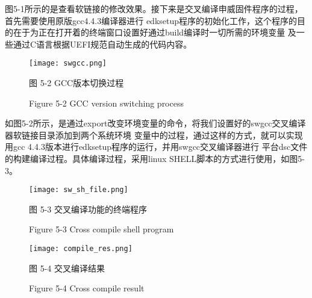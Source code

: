 图5-1所示的是查看软链接的修改效果。接下来是交叉编译申威固件程序的过程，首先需要使用原版gcc4.4.3编译器进行
edksetup程序的初始化工作，这个程序的目的在于为正在打开着的终端窗口设置好通过build编译时一切所需的环境变量
及一些通过C语言根据UEFI规范自动生成的代码内容。

\begin{figure}[htb]
    \vspace{0cm}   
    \setlength{\abovecaptionskip}{0.3cm}
	\centering
    \texttt{[image: swgcc.png]}
    \caption*{图 5-2 GCC版本切换过程}
    \setlength{\belowcaptionskip}{-0.7cm}
    \caption*{Figure 5-2 GCC version switching process}
\end{figure}

如图5-2所示，是通过export改变环境变量的命令，将我们设置好的swgcc交叉编译器软链接目录添加到两个系统环境
变量中的过程，通过这样的方式，就可以实现用gcc 4.4.3版本进行edksetup程序的运行，并用swgcc交叉编译器进行
平台dsc文件的构建编译过程。具体编译过程，采用linux SHELL脚本的方式进行使用，如图5-3。

\begin{figure}[H]
    \vspace{0cm}   
    \setlength{\abovecaptionskip}{0.3cm}
	\centering
    \texttt{[image: sw\_sh\_file.png]}
    \caption*{图 5-3 交叉编译功能的终端程序}
    \setlength{\belowcaptionskip}{-0.7cm}
    \caption*{Figure 5-3 Cross compile shell program}
\end{figure}

\begin{figure}[htb]
    \vspace{0cm}   
    \setlength{\abovecaptionskip}{0.3cm}
	\centering
    \texttt{[image: compile\_res.png]}
    \caption*{图 5-4 交叉编译结果}
    \setlength{\belowcaptionskip}{-0.7cm}
    \caption*{Figure 5-4 Cross compile result}
\end{figure}

